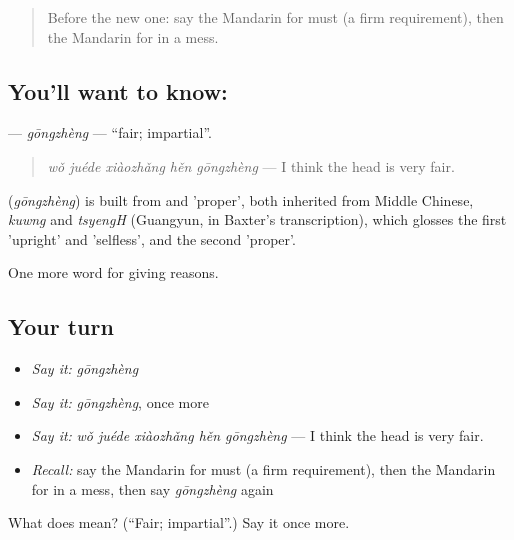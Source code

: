 \label{lesson:ZH-C362-gongzheng}



\begin{quote}
Before the new one: say the Mandarin for must (a firm requirement), then the Mandarin for in a mess.
\end{quote}

\subsection*{You'll want to know: }
\textbf{} — \emph{gōngzhèng} — \textquotedblleft{}fair; impartial\textquotedblright{}.

\begin{quote}
\textbf{} \emph{wǒ juéde xiàozhǎng hěn gōngzhèng} — I think the head is very fair.
\end{quote}

\begin{cousinweb}
\textbf{} (\emph{gōngzhèng}) is built from  and  'proper', both inherited from Middle Chinese, \emph{kuwng} and \emph{tsyengH} (Guangyun, in Baxter's transcription), which glosses the first 'upright' and 'selfless', and the second 'proper'.
\end{cousinweb}

\begin{grammarlens}[title={What you've built}]
One more word for giving reasons.
\end{grammarlens}

\subsection*{Your turn}
\begin{itemize}
\raggedright
  \item \emph{Say it:} \emph{gōngzhèng}
  \item \emph{Say it:} \emph{gōngzhèng}, once more
  \item \emph{Say it:} \emph{wǒ juéde xiàozhǎng hěn gōngzhèng} — I think the head is very fair.
  \item \emph{Recall:} say the Mandarin for must (a firm requirement), then the Mandarin for in a mess, then say \emph{gōngzhèng} again
\end{itemize}

\begin{tcolorbox}[breakable,colback=teal!4,colframe=teal!35!black,title={Before you move on}]
What does  mean? (\textquotedblleft{}Fair; impartial\textquotedblright{}.) Say it once more.
\end{tcolorbox}
